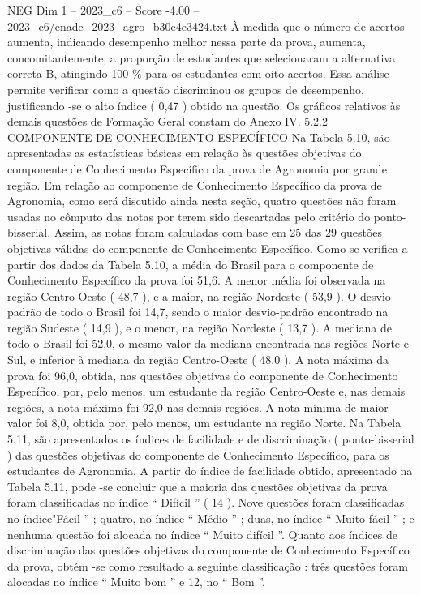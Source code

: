 \begin{textsample}{NEG Dim 1 – 2023\_c6 – Score -4.00 – 2023\_c6/enade\_2023\_agro\_b30e4e3424.txt}
À medida que o número de acertos aumenta, indicando desempenho melhor nessa parte da prova, aumenta, concomitantemente, a proporção de estudantes que selecionaram a alternativa correta B, atingindo 100 \% para os estudantes com oito acertos.
Essa análise permite verificar como a questão discriminou os grupos de desempenho, justificando -se o alto índice ( 0,47 ) obtido na questão.
Os gráficos relativos às demais questões de Formação Geral constam do Anexo IV. 5.2.2 COMPONENTE DE CONHECIMENTO ESPECÍFICO Na Tabela 5.10, são apresentadas as estatísticas básicas em relação às questões objetivas do componente de Conhecimento Específico da prova de Agronomia por grande região.
Em relação ao componente de Conhecimento Específico da prova de Agronomia, como será discutido ainda nesta seção, quatro questões não foram usadas no cômputo das notas por terem sido descartadas pelo critério do ponto-bisserial.
Assim, as notas foram calculadas com base em 25 das 29 questões objetivas válidas do componente de Conhecimento Específico.
Como se verifica a partir dos dados da Tabela 5.10, a média do Brasil para o componente de Conhecimento Específico da prova foi 51,6.
A menor média foi observada na região Centro-Oeste ( 48,7 ), e a maior, na região Nordeste ( 53,9 ).
O desvio-padrão de todo o Brasil foi 14,7, sendo o maior desvio-padrão encontrado na região Sudeste ( 14,9 ), e o menor, na região Nordeste ( 13,7 ).
A mediana de todo o Brasil foi 52,0, o mesmo valor da mediana encontrada nas regiões Norte e Sul, e inferior à mediana da região Centro-Oeste ( 48,0 ).
A nota máxima da prova foi 96,0, obtida, nas questões objetivas do componente de Conhecimento Específico, por, pelo menos, um estudante da região Centro-Oeste e, nas demais regiões, a nota máxima foi 92,0 nas demais regiões.
A nota mínima de maior valor foi 8,0, obtida por, pelo menos, um estudante na região Norte.
Na Tabela 5.11, são apresentados os índices de facilidade e de discriminação ( ponto-bisserial ) das questões objetivas do componente de Conhecimento Específico, para os estudantes de Agronomia.
A partir do índice de facilidade obtido, apresentado na Tabela 5.11, pode -se concluir que a maioria das questões objetivas da prova foram classificadas no índice “ Difícil ” ( 14 ).
Nove questões foram classificadas no índice"Fácil ” ; quatro, no índice “ Médio ” ; duas, no índice “ Muito fácil ” ; e nenhuma questão foi alocada no índice “ Muito difícil ”.
Quanto aos índices de discriminação das questões objetivas do componente de Conhecimento Específico da prova, obtém -se como resultado a seguinte classificação : três questões foram alocadas no índice “ Muito bom ” e 12, no “ Bom ”.

\end{textsample}
